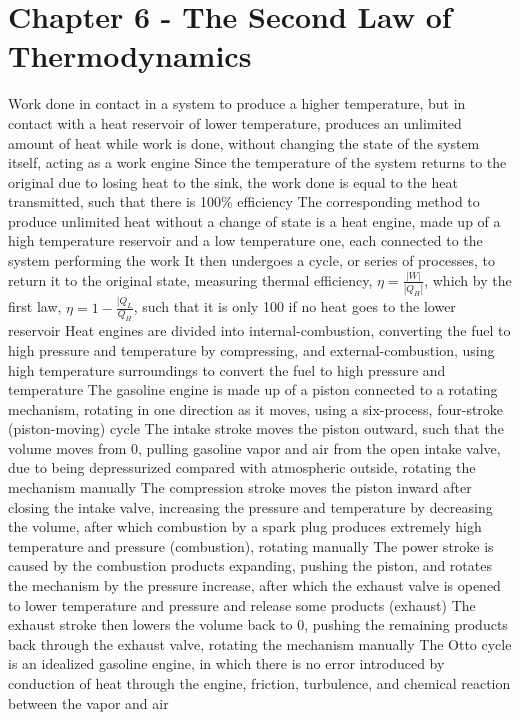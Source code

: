 \documentclass[11 pt, twoside]{article}
\newenvironment{outline*}
{
	\begin{outline}[enumerate]
	}
	{\end{outline}
}
\begin{document}
\section{Chapter 6 - The Second Law of Thermodynamics}
\begin{outline*}
\1 Work done in contact in a system to produce a higher temperature, but in contact with a heat reservoir of lower temperature, produces an unlimited amount of heat while work is done, without changing the state of the system itself, acting as a work engine
\2 Since the temperature of the system returns to the original due to losing heat to the sink, the work done is equal to the heat transmitted, such that there is 100\% efficiency
\1 The corresponding method to produce unlimited heat without a change of state is a heat engine, made up of a high temperature reservoir and a low temperature one, each connected to the system performing the work
\2 It then undergoes a cycle, or series of processes, to return it to the original state, measuring thermal efficiency, $\eta = \frac{|W|}{|Q_H|}$, which by the first law, $\eta = 1 - \frac{|Q_L}{Q_H}$, such that it is only 100 if no heat goes to the lower reservoir
\2 Heat engines are divided into internal-combustion, converting the fuel to high pressure and temperature by compressing, and external-combustion, using high temperature surroundings to convert the fuel to high pressure and temperature
\1 The gasoline engine is made up of a piston connected to a rotating mechanism, rotating in one direction as it moves, using a six-process, four-stroke (piston-moving) cycle 
\2 The intake stroke moves the piston outward, such that the volume moves from 0, pulling gasoline vapor and air from the open intake valve, due to being depressurized compared with atmospheric outside, rotating the mechanism manually
\2 The compression stroke moves the piston inward after closing the intake valve, increasing the pressure and temperature by decreasing the volume, after which combustion by a spark plug produces extremely high temperature and pressure (combustion), rotating manually
\2 The power stroke is caused by the combustion products expanding, pushing the piston, and rotates the mechanism by the pressure increase, after which the exhaust valve is opened to lower temperature and pressure and release some products (exhaust)
\2 The exhaust stroke then lowers the volume back to 0, pushing the remaining products back through the exhaust valve, rotating the mechanism manually
\1 The Otto cycle is an idealized gasoline engine, in which there is no error introduced by conduction of heat through the engine, friction, turbulence, and chemical reaction between the vapor and air

\end{outline*}
\end{document}
